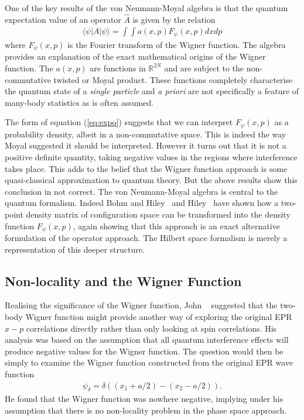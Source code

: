 \documentclass[11pt]{article}
\begin{document}
One of the key results of the von Neumann-Moyal algebra is that the quantum expectation value of an operator $\hat A$ is given by the relation
\begin{eqnarray}
\langle\psi|A|\psi\rangle=\int \int a(x,p)F_\psi(x,p)dxdp	\label{eq:expo}
\end{eqnarray}
where $F_\psi(x,p)$ is the Fourier transform of the Wigner function.  The algebra provides an explanation of the exact mathematical origins of the Wigner function.   The $a(x,p)$ are functions in $\mathbb R^{2N}$ and are subject to the non-commutative twisted or Moyal product.  These functions completely characterise the quantum state of a {\em single particle} and {\em a priori} are not specifically a feature of many-body statistics as is often assumed.

The form of equation (\ref{eq:expo}) suggests that we can interpret $F_\psi(x,p)$ as a probability density, albeit in a non-commutative space. This is indeed the way Moyal suggested it should be interpreted.  However it turns out that it is not a positive definite quantity, taking negative values in the regions where interference takes place.  This adds to the belief that the Wigner function approach is some quasi-classical approximation to quantum theory.  But the above results show this conclusion in not correct.  The von Neumann-Moyal algebra is central to the quantum formalism.  Indeed Bohm and Hiley~\cite{dbbh81} and Hiley~\cite{bh11}
have shown  how a two-point density matrix of configuration space  can be transformed into the density function $F_\psi(x,p)$, again showing that this  approach is an exact alternative formulation of the operator approach.  The Hilbert space formalism is merely a representation of this deeper structure.





\subsection{Non-locality and the Wigner Function}

Realising the significance of the Wigner function, John ~\cite{jb86}  suggested that the two-body Wigner function might provide another way of exploring the original EPR  $x-p$ correlations directly rather than only looking at spin correlations.
His analysis was based on the assumption that all quantum interference effects will produce negative values for the Wigner function.  The question would then be simply to examine the Wigner function constructed from the original  EPR wave function
\begin{eqnarray*}
\psi_\delta=\delta\left((x_1+a/2)-(x_2-a/2)\right).
\end{eqnarray*}
He found that the Wigner function was nowhere negative, implying under his assumption that there is no non-locality problem in the phase space approach. 
\end{document}

